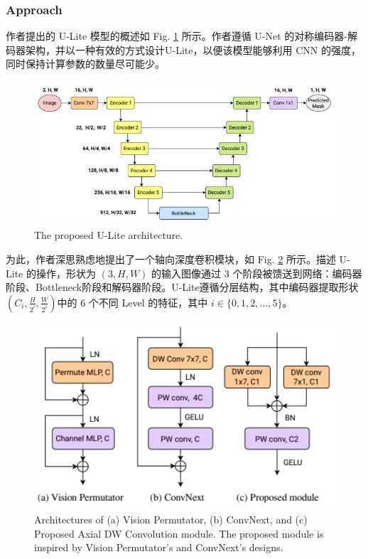 \documentclass[a4paper, 10pt]{article}
\begin{document}
			\subsubsection{Approach}
			
			作者提出的 U-Lite 模型的概述如 Fig. \ref{fig: U-Lite Architecture} 所示。作者遵循 U-Net 的对称编码器-解码器架构，并以一种有效的方式设计U-Lite，以便该模型能够利用 CNN 的强度，同时保持计算参数的数量尽可能少。
			
			\begin{figure}[htbp]
				\centering 
				\includegraphics[width=\columnwidth]{picture/Lightweight Model/U-Lite Architecture}
				\caption{
					\label{fig: U-Lite Architecture} 
					The proposed U-Lite architecture.
				}
			\end{figure}
			
			为此，作者深思熟虑地提出了一个轴向深度卷积模块，如 Fig. \ref {fig: Axial Depthwise Convolution module} 所示。描述 U-Lite 的操作，形状为 $\left(3, H, W\right)$ 的输入图像通过 $3$ 个阶段被馈送到网络：编码器阶段、Bottleneck阶段和解码器阶段。U-Lite遵循分层结构，其中编码器提取形状$\left(C_i, \frac{H}{2^{i}}, \frac{W}{2^i}\right)$中的 $6$ 个不同 Level 的特征，其中 $i \in \{0,1,2, \ldots ,5\}$。
			
			\begin{figure}[htbp]
				\centering 
				\includegraphics[width=0.6\columnwidth]{picture/Lightweight Model/Axial Depthwise Convolution module}
				\caption{
					\label{fig: Axial Depthwise Convolution module} 
					Architectures of (a) Vision Permutator, (b) ConvNext, and (c) Proposed Axial DW Convolution module. The proposed module is inspired by Vision Permutator’s and ConvNext's designs.
				}
			\end{figure}
			
\end{document}
